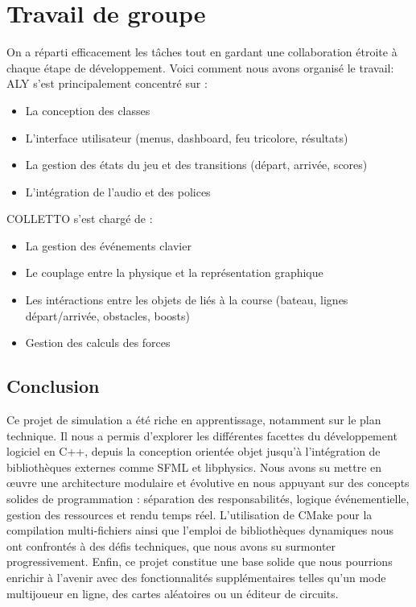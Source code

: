 \documentclass[a4paper,margin=1cm,11pt]{report}
\begin{document}
\chapter{Travail de groupe}
On a réparti efficacement les tâches tout en gardant une collaboration étroite à chaque étape de développement. Voici comment nous avons organisé le travail:\\
ALY s’est principalement concentré sur :
\begin{itemize}
	\item La conception des classes
	\item L’interface utilisateur (menus, dashboard, feu tricolore, résultats)
	\item La gestion des états du jeu et des transitions (départ, arrivée, scores)
	\item L’intégration de l’audio et des polices\\
\end{itemize}
COLLETTO s’est chargé de :
\begin{itemize}
	\item La gestion des événements clavier
	\item Le couplage entre la physique et la représentation graphique
	\item Les intéractions entre les objets de liés à la course (bateau, lignes départ/arrivée, obstacles, boosts)
	\item Gestion des calculs des forces
\end{itemize}

\newpage
\section*{Conclusion}
Ce projet de simulation a été riche en apprentissage, notamment sur le plan technique. Il nous a permis d’explorer les différentes facettes du développement logiciel en C++, depuis la conception orientée objet jusqu’à l’intégration de bibliothèques externes comme SFML et libphysics. 
Nous avons su mettre en œuvre une architecture modulaire et évolutive en nous appuyant sur des concepts solides de programmation : séparation des responsabilités, logique événementielle, gestion des ressources et rendu temps réel. L’utilisation de CMake pour la compilation multi-fichiers ainsi que l’emploi de bibliothèques dynamiques nous ont confrontés à des défis techniques, que nous avons su surmonter progressivement.
Enfin, ce projet constitue une base solide que nous pourrions enrichir à l’avenir avec des fonctionnalités supplémentaires telles qu’un mode multijoueur en ligne, des cartes aléatoires ou un éditeur de circuits.
\end{document}
